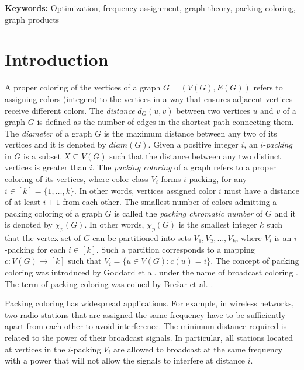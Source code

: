 \documentclass{article}
\begin{document}

{\small{\textbf{Keywords:} Optimization, frequency assignment, graph theory, packing coloring, graph products}}


\section{Introduction}

A proper coloring of the vertices of a graph $G=(V(G), E(G))$ refers to assigning colors (integers) to the vertices in a way that ensures adjacent vertices receive different colors. The \emph{distance} $d_{G}(u, v)$ between two vertices $u$ and $v$ of a graph $G$ is defined as the number of edges in the shortest path connecting them. The \emph{diameter} of a graph $G$ is the maximum distance between any two of its vertices and it is denoted by $diam(G)$. Given a positive integer $i$, an $i$-\emph{packing} in $G$ is a subset $X \subseteq V(G)$ such that the distance between any two distinct vertices is greater than $i$. The \emph{packing coloring} of a graph refers to a proper coloring of its vertices, where color class $V_i$ forms $i$-packing, for any $i\in[k]=\{1, \ldots, k\}$. In other words, 
vertices assigned color $i$ must have a distance of at least $i+1$ from each other. The smallest number of colors admitting a packing coloring of a graph $G$ is called the \emph{packing chromatic number} of $G$ and it is denoted by \emph{$\chi_p(G)$}. In other words, \emph{$\chi_p(G)$} is the smallest integer $k$ such that the vertex set of $G$ can be partitioned into sets $V_1, V_2, \ldots, V_k$, where $V_i$ is an $i$-packing for each $i \in [k]$. Such a partition corresponds to a mapping $c:V(G)\rightarrow [k]$ such that $V_i=\{u \in V(G): c(u)=i\}$. The concept of packing coloring was introduced by Goddard et al. under the name of broadcast coloring \cite{goddard2008broadcast}. The term of packing coloring was coined by Brešar et al. \cite{packing1}.

Packing coloring has widespread applications. For example, in wireless networks, two radio stations
that are assigned the same frequency have to be sufficiently apart from each other to avoid
interference. The minimum distance required is related to the power of their broadcast signals. In particular,
all stations located at vertices in the $i$-packing $V_i$ are allowed to broadcast at the same frequency with a
power that will not allow the signals to interfere at distance $i$. 
\end{document}
